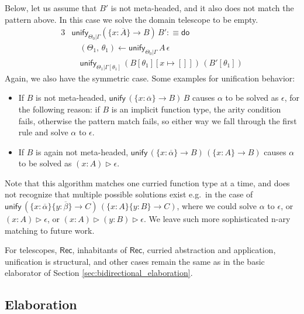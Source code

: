 \documentclass[acmsmall,screen,dvipsnames]{acmart}\settopmatter{}
\newcommand{\unify}{\mathsf{unify}}
\newcommand{\edo}{\boldsymbol{\mathsf{do}}}
\newcommand{\TCons}{\triangleright}
\newcommand{\Rec}{\mathsf{Rec}}
\newcommand{\ol}[1]{\overline{#1}}
\theoremstyle{remark}
\begin{document}
Below, let us assume that $B'$ is not meta-headed, and it also does not match
the pattern above. In this case we solve the domain telescope to be empty.
\begin{alignat*}{3}
& \unify_{\Theta_0|\Gamma}(\{x : \ol{A}\}\to B)\,B' :\equiv \edo\\
& \quad (\Theta_1,\,\theta_1) \leftarrow \unify_{\Theta_0|\Gamma}\,A\,\epsilon\\
& \quad \unify_{\Theta_1|\Gamma[\theta_1]}\,(B[\theta_1][x\mapsto[]])\,(B'[\theta_1])
\end{alignat*}
Again, we also have the symmetric case. Some examples for unification behavior:
\begin{itemize}
\item If $B$ is not meta-headed, $\unify\,(\{x : \ol{\alpha}\}\to B)\,B$ causes
  $\alpha$ to be solved as $\epsilon$, for the following reason: if $B$ is an
  implicit function type, the arity condition fails, otherwise the pattern match
  fails, so either way we fall through the first rule and solve $\alpha$ to
  $\epsilon$.
\item If $B$ is again not meta-headed, $\unify\,(\{x : \ol{\alpha}\}\to B)\,(\{x
  : A\}\to B)$ causes $\alpha$ to be solved as $(x : A) \TCons \epsilon$.
\end{itemize}
Note that this algorithm matches one curried function type at a time, and does
not recognize that multiple possible solutions exist e.g.\ in the case of
$\unify\,(\{x : \ol{\alpha}\}\{y : \ol{\beta}\}\to C)\,(\{x : A\}\{y : B\}\to
C)$, where we could solve $\alpha$ to $\epsilon$, or $(x : A)\TCons\epsilon$, or
$(x : A)\TCons(y : B)\TCons\epsilon$. We leave such more sophisticated n-ary
matching to future work.

For telescopes, $\Rec$, inhabitants of $\Rec$, curried abstraction and
application, unification is structural, and other cases remain the same as in
the basic elaborator of Section \ref{sec:bidirectional_elaboration}.

\subsection{Elaboration}
\end{document}
